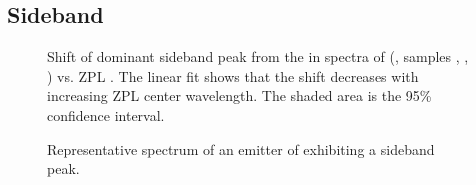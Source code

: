 


	\subsection{Sideband} \label{subsubsec::sideband}

		\begin{figure}[tp]
			\centering
			\caption{Shift of dominant sideband peak from the \ZPL in spectra of \sivs (\gv, samples \insituF, \insituS, \insituH) vs. ZPL \cwl. The linear fit shows that the shift decreases with increasing ZPL center wavelength. The shaded area is the 95\% confidence interval.}
			\label{fig::sideband_fit}
		\end{figure}

		\begin{figure}[tp]
			\centering
			\caption{Representative spectrum of an emitter of \gv exhibiting a sideband peak.}
			\label{fig::broad_peak_sb}
		\end{figure}


